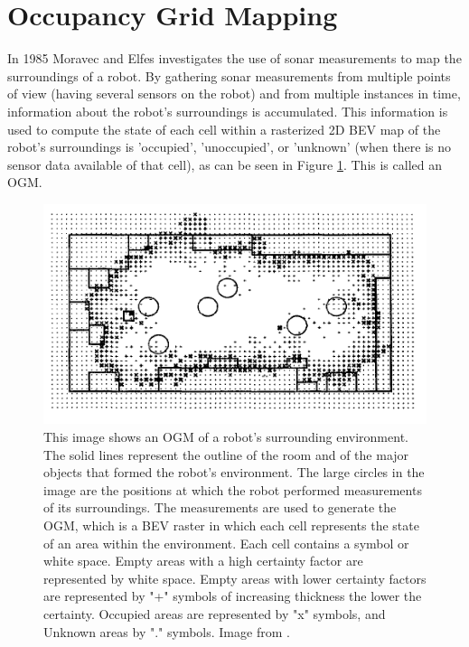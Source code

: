 \section{Occupancy Grid Mapping} \label{sec:ogm}
In 1985 Moravec and Elfes \cite{moravec1985high} investigates the use of sonar measurements to map the surroundings of a robot. By gathering sonar measurements from multiple points of view (having several sensors on the robot) and from multiple instances in time, information about the robot's surroundings is accumulated. This information is used to compute the state of each cell within a rasterized 2D \gls{BEV} map of the robot's surroundings is 'occupied', 'unoccupied', or 'unknown' (when there is no sensor data available of that cell), as can be seen in Figure \ref{fig:OGMBEVmoravec}. This is called an \gls{OGM}. \\

\begin{figure}[h]
	\centering
	\includegraphics[width=0.6\linewidth]{Figures/Occupancy_Grid_Map/The_Two-dimensional_Sonar_map}
	\caption{This image shows an \gls{OGM} of a robot's surrounding environment. The solid lines represent the outline of the room and of the major objects that formed the robot's environment. The large circles in the image are the positions at which the robot performed measurements of its surroundings. The measurements are used to generate the \gls{OGM}, which is a \gls{BEV} raster in which each cell represents the state of an area within the environment. Each cell contains a symbol or white space. Empty areas with a high certainty factor are represented by white space. Empty areas with lower certainty factors are represented by "+" symbols of increasing thickness the lower the certainty. Occupied areas are represented by "x" symbols, and Unknown areas by "." symbols. Image from \cite{moravec1985high}.}
	\label{fig:OGMBEVmoravec}
\end{figure}

